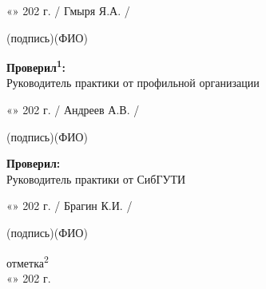 \vspace{1.2cm}

«\underline{\hspace{1cm}}» \underline{\hspace{2.5cm}} 202\underline{\hspace{0.7cm}} г. \hfill
\underline{\hspace{4cm}} / Гмыря Я.А. /

\vspace{0.25cm}
\hfill {\footnotesize (подпись)\hspace{1.2cm}(ФИО)}

\vspace{1.1cm}

\textbf{Проверил\textsuperscript{1}:}\\
Руководитель практики от профильной организации

\vspace{0.5cm}

«\underline{\hspace{1cm}}» \underline{\hspace{2.5cm}} 202\underline{\hspace{0.7cm}} г. \hfill
\underline{\hspace{4cm}} / Андреев А.В. /

\vspace{0.25cm}
\hfill {\footnotesize (подпись)\hspace{1.2cm}(ФИО)}

\vspace{1.1cm}

\textbf{Проверил:}\\
Руководитель практики от СибГУТИ

\vspace{0.5cm}

«\underline{\hspace{1cm}}» \underline{\hspace{2.5cm}} 202\underline{\hspace{0.7cm}} г. \hfill
\underline{\hspace{4cm}} / Брагин К.И. /

\vspace{0.25cm}
\hfill {\footnotesize (подпись)\hspace{1.2cm}(ФИО)}

\vspace{1.1cm}

отметка\textsuperscript{2} \underline{\hspace{6cm}}\\[0.7em]
\hfill «\underline{\hspace{1cm}}» \underline{\hspace{2.5cm}} 202\underline{\hspace{0.7cm}} г.

